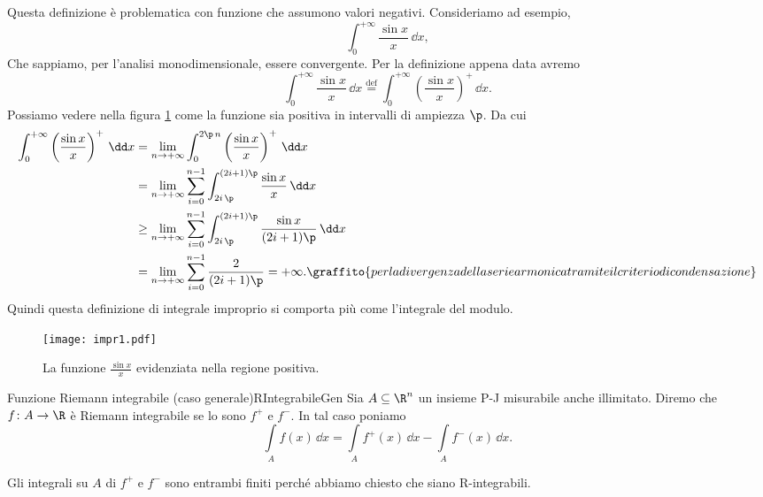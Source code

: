 \begin{ese}
	Questa definizione è problematica con funzione che assumono valori negativi.
	Consideriamo ad esempio,
	\[
		\int_0^{+\infty}\frac{\sin x}{x}\,\dd x,
	\]
	Che sappiamo, per l'analisi monodimensionale, essere convergente.
	Per la definizione appena data avremo
	\[
		\int_0^{+\infty}\frac{\sin x}{x}\,\dd x \overset{\text{def}}{=} \int_0^{+\infty} \left( \frac{\sin x}{x} \right)^+\,\dd x.
	\]
	Possiamo vedere nella figura \ref{fig:impr1} come la funzione sia positiva in intervalli di ampiezza \(\p\).
	Da cui
	\[
		\begin{split}
			\int_0^{+\infty} \left(\frac{\sin x}{x}\right)^+\,\dd x & = \lim_{n\to +\infty} \int_0^{2\p\,n} \left( \frac{\sin x}{x} \right)^+\,\dd x\\
			& = \lim_{n\to +\infty}\sum_{i=0}^{n-1} \int_{2i\,\p}^{(2i+1)\p} \frac{\sin x}{x}\,\dd x\\
			& \ge \lim_{n\to +\infty} \sum_{i=0}^{n-1} \int_{2i\,\p}^{(2i+1)\p} \frac{\sin x}{(2i+1)\p}\,\dd x\\
			& = \lim_{n\to +\infty}\sum_{i=0}^{n-1} \frac{2}{(2i+1)\p} = +\infty.\graffito{per la divergenza della serie armonica tramite il criterio di condensazione}
		\end{split}
	\]
	Quindi questa definizione di integrale improprio si comporta più come l'integrale del modulo.
\end{ese}

\begin{figure}[tp]
	\begin{centering}
		\texttt{[image: impr1.pdf]}
		\caption{La funzione \(\frac{\sin x}{x}\) evidenziata nella regione positiva.}
		\label{fig:impr1}
	\end{centering}
\end{figure}

\begin{defn}{Funzione Riemann integrabile (caso generale)}{RIntegrabileGen}
	Sia \(A\subseteq\R^n\) un insieme P-J misurabile anche illimitato.
	Diremo che \(f\colon A \to \R\) è Riemann integrabile se lo sono \(f^+\) e \(f^-\).
	In tal caso poniamo
	\[
		\int\limits_A f(x)\,\dd x = \int\limits_A f^+(x)\,\dd x -\int\limits_A f^-(x)\,\dd x.
	\]
\end{defn}

\begin{oss}
	Gli integrali su \(A\) di \(f^+\) e \(f^-\) sono entrambi finiti perché abbiamo chiesto che siano R-integrabili.
\end{oss}

